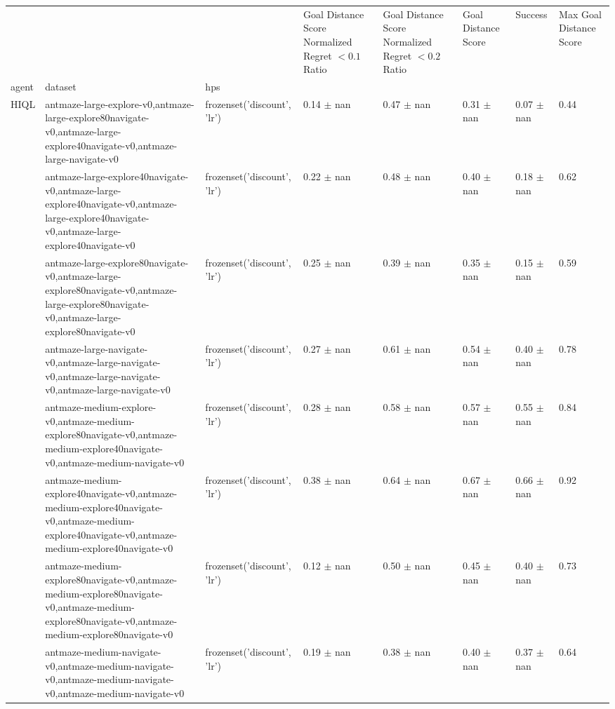 \begin{tabular}{llllllll}
\toprule
 &  &  & Goal Distance Score Normalized Regret $< 0.1$ Ratio & Goal Distance Score Normalized Regret $< 0.2$ Ratio & Goal Distance Score & Success & Max Goal Distance Score \\
agent & dataset & hps &  &  &  &  &  \\
\midrule
\multirow[t]{8}{*}{HIQL} & antmaze-large-explore-v0,antmaze-large-explore80navigate-v0,antmaze-large-explore40navigate-v0,antmaze-large-navigate-v0 & frozenset({'discount', 'lr'}) & 0.14 $\pm$ nan & 0.47 $\pm$ nan & 0.31 $\pm$ nan & 0.07 $\pm$ nan & 0.44 \\
\cline{2-8}
 & antmaze-large-explore40navigate-v0,antmaze-large-explore40navigate-v0,antmaze-large-explore40navigate-v0,antmaze-large-explore40navigate-v0 & frozenset({'discount', 'lr'}) & 0.22 $\pm$ nan & 0.48 $\pm$ nan & 0.40 $\pm$ nan & 0.18 $\pm$ nan & 0.62 \\
\cline{2-8}
 & antmaze-large-explore80navigate-v0,antmaze-large-explore80navigate-v0,antmaze-large-explore80navigate-v0,antmaze-large-explore80navigate-v0 & frozenset({'discount', 'lr'}) & 0.25 $\pm$ nan & 0.39 $\pm$ nan & 0.35 $\pm$ nan & 0.15 $\pm$ nan & 0.59 \\
\cline{2-8}
 & antmaze-large-navigate-v0,antmaze-large-navigate-v0,antmaze-large-navigate-v0,antmaze-large-navigate-v0 & frozenset({'discount', 'lr'}) & 0.27 $\pm$ nan & 0.61 $\pm$ nan & 0.54 $\pm$ nan & 0.40 $\pm$ nan & 0.78 \\
\cline{2-8}
 & antmaze-medium-explore-v0,antmaze-medium-explore80navigate-v0,antmaze-medium-explore40navigate-v0,antmaze-medium-navigate-v0 & frozenset({'discount', 'lr'}) & 0.28 $\pm$ nan & 0.58 $\pm$ nan & 0.57 $\pm$ nan & 0.55 $\pm$ nan & 0.84 \\
\cline{2-8}
 & antmaze-medium-explore40navigate-v0,antmaze-medium-explore40navigate-v0,antmaze-medium-explore40navigate-v0,antmaze-medium-explore40navigate-v0 & frozenset({'discount', 'lr'}) & 0.38 $\pm$ nan & 0.64 $\pm$ nan & 0.67 $\pm$ nan & 0.66 $\pm$ nan & 0.92 \\
\cline{2-8}
 & antmaze-medium-explore80navigate-v0,antmaze-medium-explore80navigate-v0,antmaze-medium-explore80navigate-v0,antmaze-medium-explore80navigate-v0 & frozenset({'discount', 'lr'}) & 0.12 $\pm$ nan & 0.50 $\pm$ nan & 0.45 $\pm$ nan & 0.40 $\pm$ nan & 0.73 \\
\cline{2-8}
 & antmaze-medium-navigate-v0,antmaze-medium-navigate-v0,antmaze-medium-navigate-v0,antmaze-medium-navigate-v0 & frozenset({'discount', 'lr'}) & 0.19 $\pm$ nan & 0.38 $\pm$ nan & 0.40 $\pm$ nan & 0.37 $\pm$ nan & 0.64 \\

\end{tabular}
